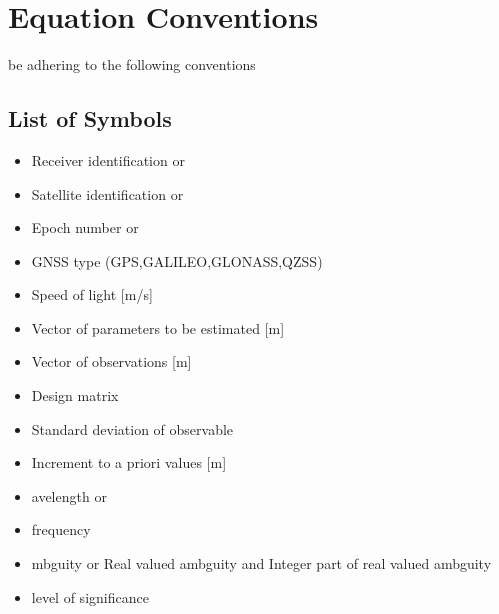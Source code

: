 \chapter{Equation Conventions}
\label{ch:conventions}

 be adhering to the following conventions

\section{List of Symbols}

\begin{itemize}
	\item {\LARGE{}} Receiver identification or {\LARGE{}}
	\item {\LARGE{}} Satellite identification or {\LARGE{}}
	\item {\LARGE{}} Epoch number or {\LARGE{}}
	\item {\LARGE{}} GNSS type (GPS,GALILEO,GLONASS,QZSS)
	\item {\LARGE{}} Speed of light [m/s]
	\item {\LARGE{}} Vector of parameters to be estimated [m]
	\item {\LARGE{}} Vector of observations [m]
	\item {\LARGE{}} Design matrix
	\item {\LARGE{\boldmath{$\sigma$}}} Standard deviation of observable
	\item {\LARGE{\boldmath{$\Delta$}}} Increment to a priori values [m]
	\item {\LARGE{\boldmath{$\omega$}}}avelength or {\LARGE{}}
	\item {\LARGE{}} frequency
	\item {\LARGE{\boldmath{$\alpha$}}}mbguity or {\LARGE{}} Real valued ambguity and {\LARGE{}} Integer part of real valued ambguity
	\item {\LARGE{\boldmath{$\alpha$}}} level of significance
	

\end{itemize}
